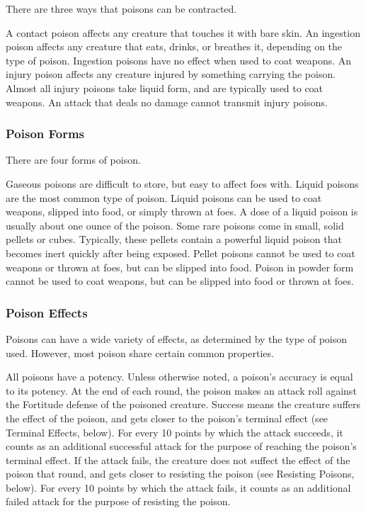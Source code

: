 There are three ways that poisons can be contracted.

 A contact poison affects any creature that touches it with bare skin.
 An ingestion poison affects any creature that eats, drinks, or breathes it, depending on the type of poison.
Ingestion poisons have no effect when used to coat weapons.
 An injury poison affects any creature injured by something carrying the poison.
Almost all injury poisons take liquid form, and are typically used to coat weapons.
An attack that deals no damage cannot transmit injury poisons.

\subsubsection{Poison Forms}\label{Poison Forms}

There are four forms of poison.

 Gaseous poisons are difficult to store, but easy to affect foes with.
 Liquid poisons are the most common type of poison.
Liquid poisons can be used to coat weapons, slipped into food, or simply thrown at foes.
A dose of a liquid poison is usually about one ounce of the poison.
 Some rare poisons come in small, solid pellets or cubes.
Typically, these pellets contain a powerful liquid poison that becomes inert quickly after being exposed.
Pellet poisons cannot be used to coat weapons or thrown at foes, but can be slipped into food.
 Poison in powder form cannot be used to coat weapons, but can be slipped into food or thrown at foes.

\subsubsection{Poison Effects}\label{Poison Effects}

Poisons can have a wide variety of effects, as determined by the type of poison used.
However, most poison share certain common properties.

\label{Potency}\label{Poison Potency}
All poisons have a potency.
Unless otherwise noted, a poison's accuracy is equal to its potency.
At the end of each round, the poison makes an attack roll against the Fortitude defense of the poisoned creature.
Success means the creature suffers the effect of the poison, and gets closer to the poison's terminal effect (see Terminal Effects, below).
For every 10 points by which the attack succeeds, it counts as an additional successful attack for the purpose of reaching the poison's terminal effect.
If the attack fails, the creature does not suffect the effect of the poison that round, and gets closer to resisting the poison (see Resisting Poisons, below).
For every 10 points by which the attack fails, it counts as an additional failed attack for the purpose of resisting the poison.

